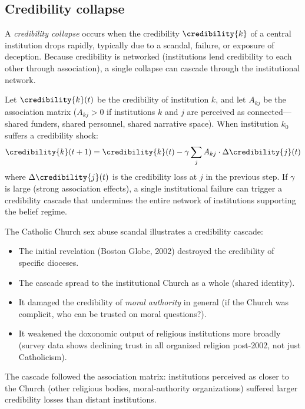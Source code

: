 \subsection{Credibility collapse}

\begin{definition}
\label{def:credibility-collapse}
A \emph{credibility collapse} occurs when the credibility $\credibility{k}$ of a central institution drops rapidly, typically due to a scandal, failure, or exposure of deception.
Because credibility is networked (institutions lend credibility to each other through association), a single collapse can cascade through the institutional network.
\end{definition}

\begin{model}
\label{mod:credibility-cascade}
Let $\credibility{k}(t)$ be the credibility of institution $k$, and let $A_{kj}$ be the association matrix ($A_{kj} > 0$ if institutions $k$ and $j$ are perceived as connected---shared funders, shared personnel, shared narrative space).
When institution $k_0$ suffers a credibility shock:
\[
  \credibility{k}(t+1) = \credibility{k}(t) - \gamma \sum_{j} A_{kj} \cdot \Delta\credibility{j}(t)
\]
where $\Delta\credibility{j}(t)$ is the credibility loss at $j$ in the previous step.
If $\gamma$ is large (strong association effects), a single institutional failure can trigger a credibility cascade that undermines the entire network of institutions supporting the belief regime.
\end{model}

\begin{example}
\label{ex:credibility-cascade}
The Catholic Church sex abuse scandal illustrates a credibility cascade:
\begin{itemize}[nosep]
  \item The initial revelation (Boston Globe, 2002) destroyed the credibility of specific dioceses.
  \item The cascade spread to the institutional Church as a whole (shared identity).
  \item It damaged the credibility of \emph{moral authority} in general (if the Church was complicit, who can be trusted on moral questions?).
  \item It weakened the doxonomic output of religious institutions more broadly (survey data shows declining trust in all organized religion post-2002, not just Catholicism).
\end{itemize}
The cascade followed the association matrix: institutions perceived as closer to the Church (other religious bodies, moral-authority organizations) suffered larger credibility losses than distant institutions.
\end{example}


